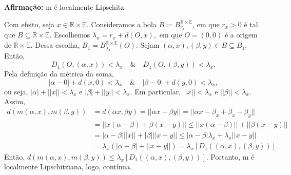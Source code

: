 \documentclass{article}
\begin{document}
\textbf{Afirmação:} m é localmente Lipschitz.

  Com efeito, seja \(x\in \mathbb{R}\times \mathbb{E}\). Consideramos a bola \(B\coloneqq B_{r_{x}}^{\mathbb{R}\times \mathbb{E}}\), em que \(r_{x}>0\)
é tal que \(B\subseteq{\mathbb{R}\times \mathbb{E}}.\) Escolhemos \(\lambda_{x} = r_{x}+d(O, x),\) em que \(O = (0, 0)\) é a origem 
de \(\mathbb{R}\times \mathbb{E}.\) Dessa escolha, \(B_{1}=B_{\lambda_{x}}^{\mathbb{R}\times \mathbb{E}}(O)\). Sejam \((\alpha , x), (\beta, y)\in B\subseteq{B_{1}}.\)
Então, 
  \[
    D_{1}(O, (\alpha , x)) < \lambda_{x}\quad\&\quad D_{1}(O, (\beta, y)) < \lambda_{x}.
  \]
  Pela definição da métrica da soma, 
    \[
      |\alpha - 0| + d(x, 0) < \lambda_{x}\quad\&\quad |\beta - 0| + d(y, 0) < \lambda_{x},
    \]
  ou seja, \(|\alpha | + ||x|| < \lambda_{x}\) e \(|\beta |+||y||<\lambda_{x}\). Em particular, \(||x|| < \lambda_{x}\) e \(||\beta || < \lambda_{x}\). Assim, 
 \begin{align*}
   d(m(\alpha, x), m(\beta, y)) &= d(\alpha x, \beta y) = ||\alpha x - \beta y|| = ||\alpha x-\beta _{x}+\beta _{x}-\beta _{y}||\\
                                &=||x(\alpha -\beta ) + \beta (x-y)||\leq ||x(\alpha -\beta )|| + ||\beta (x-y)||\\
                                &=|\alpha -\beta |||x||+|\beta |||x-y||\leq |\alpha -\beta |\lambda_{x} + \lambda_{x}||x-y||\\
                                &=\lambda_{x}(|\alpha -\beta | + ||x-y||) = \lambda_{x}[D_{1}((\alpha , x), (\beta , y))].
 \end{align*}
 Então, \(d(m(\alpha , x), m(\beta , y))\leq \lambda_{x}[D_{1}((\alpha, x), (\beta , y))] \). Portanto, m é localmente Lipschitziana, logo, contínua.
\end{document}

